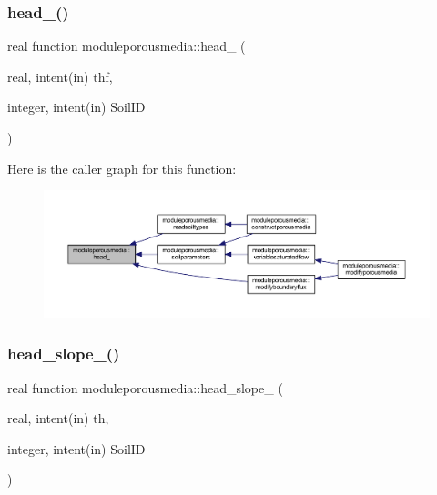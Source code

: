 \subsubsection{\texorpdfstring{head\+\_\+()}{head\_()}}
{\footnotesize\ttfamily real function moduleporousmedia\+::head\+\_\+ (\begin{DoxyParamCaption}\item[{real, intent(in)}]{thf,  }\item[{integer, intent(in)}]{Soil\+ID }\end{DoxyParamCaption})\hspace{0.3cm}{\ttfamily [private]}}

Here is the caller graph for this function\+:\nopagebreak
\begin{figure}[H]
\begin{center}
\leavevmode
\includegraphics[width=350pt]{namespacemoduleporousmedia_a8bee2fc4ac5baf4e997680a0b63e34b3_icgraph}
\end{center}
\end{figure}
\mbox{\label{namespacemoduleporousmedia_a3c4b0e307933259bb0fd3bb97624a021}} 
\subsubsection{\texorpdfstring{head\+\_\+slope\+\_\+()}{head\_slope\_()}}
{\footnotesize\ttfamily real function moduleporousmedia\+::head\+\_\+slope\+\_\+ (\begin{DoxyParamCaption}\item[{real, intent(in)}]{th,  }\item[{integer, intent(in)}]{Soil\+ID }\end{DoxyParamCaption})\hspace{0.3cm}{\ttfamily [private]}}

